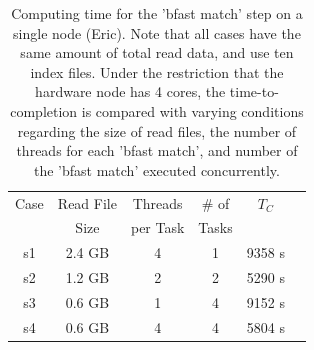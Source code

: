\documentclass{cpeauth}
\begin{document}
 \begin{table}
 \small
 \begin{tabular}{|c|c|c|c|c|c|} 
 \hline 
Case & Read File  & Threads & \# of   & $T_C$ \\
& Size &  per Task &  Tasks &   \\  \hline
s1 & 2.4 GB &  4 & 1 & 9358 s \\
s2 & 1.2 GB & 2 & 2 & 5290 s \\
s3 & 0.6 GB & 1 & 4 & 9152 s \\ 
s4& 0.6 GB & 4 & 4 & 5804 s \\

 \hline
 \end{tabular}
 
 \caption{Computing time for the 'bfast match' step on a single node
   (Eric). Note that all cases have the same amount of total read
   data, and use ten index files.  Under the restriction that the
   hardware node has 4 cores, the time-to-completion is compared with
   varying conditions regarding the size of read files, the number of
   threads for each 'bfast match', and number of the 'bfast match'
   executed concurrently.}
    \label{table:understandio}
\end{table}







\end{document}
